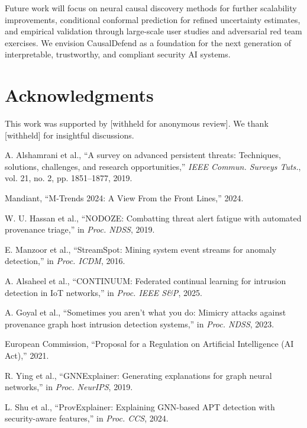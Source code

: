 \documentclass[conference]{IEEEtran}
\begin{document}
Future work will focus on neural causal discovery methods for further scalability improvements, conditional conformal prediction for refined uncertainty estimates, and empirical validation through large-scale user studies and adversarial red team exercises. We envision CausalDefend as a foundation for the next generation of interpretable, trustworthy, and compliant security AI systems.

\section*{Acknowledgments}

This work was supported by [withheld for anonymous review]. We thank [withheld] for insightful discussions.


\begin{thebibliography}{99}

A. Alshamrani et al., ``A survey on advanced persistent threats: Techniques, solutions, challenges, and research opportunities,'' \emph{IEEE Commun. Surveys Tuts.}, vol. 21, no. 2, pp. 1851--1877, 2019.

Mandiant, ``M-Trends 2024: A View From the Front Lines,'' 2024.

W. U. Hassan et al., ``NODOZE: Combatting threat alert fatigue with automated provenance triage,'' in \emph{Proc. NDSS}, 2019.

E. Manzoor et al., ``StreamSpot: Mining system event streams for anomaly detection,'' in \emph{Proc. ICDM}, 2016.

A. Alsaheel et al., ``CONTINUUM: Federated continual learning for intrusion detection in IoT networks,'' in \emph{Proc. IEEE S\&P}, 2025.

A. Goyal et al., ``Sometimes you aren't what you do: Mimicry attacks against provenance graph host intrusion detection systems,'' in \emph{Proc. NDSS}, 2023.

European Commission, ``Proposal for a Regulation on Artificial Intelligence (AI Act),'' 2021.

R. Ying et al., ``GNNExplainer: Generating explanations for graph neural networks,'' in \emph{Proc. NeurIPS}, 2019.

L. Shu et al., ``ProvExplainer: Explaining GNN-based APT detection with security-aware features,'' in \emph{Proc. CCS}, 2024.


\end{thebibliography}
\end{document}
